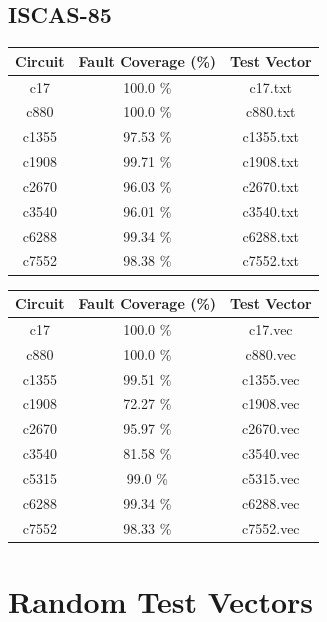 \documentclass[a4paper,12pt]{article}
\begin{document}
\clearpage
\subsection*{ISCAS-85}

\begin{center}
\begin{tabular}{||c c c||}
\hline
Circuit & Fault Coverage (\%) & Test Vector \\ [0.5ex] 
\hline\hline
c17 & 100.0 \%  & c17.txt \\ 
\hline
c880 & 100.0 \%  & c880.txt \\ 
\hline
c1355 & 97.53 \%  & c1355.txt \\ 
\hline
c1908 & 99.71 \%  & c1908.txt \\ 
\hline
c2670 & 96.03 \%  & c2670.txt \\ 
\hline
c3540 & 96.01 \%  & c3540.txt \\ 
\hline
c6288 & 99.34 \%  & c6288.txt \\ 
\hline
c7552 & 98.38 \%  & c7552.txt \\ 
\hline
\hline
\end{tabular}
\end{center}

\begin{center}
\begin{tabular}{||c c c||}
\hline
Circuit & Fault Coverage (\%) & Test Vector \\ [0.5ex] 
\hline\hline
c17 & 100.0 \%  & c17.vec \\ 
\hline
c880 & 100.0 \%  & c880.vec \\ 
\hline
c1355 & 99.51 \%  & c1355.vec \\ 
\hline
c1908 & 72.27 \%  & c1908.vec \\ 
\hline
c2670 & 95.97 \%  & c2670.vec \\ 
\hline
c3540 & 81.58 \%  & c3540.vec \\ 
\hline
c5315 & 99.0 \%  & c5315.vec \\ 
\hline
c6288 & 99.34 \%  & c6288.vec \\ 
\hline
c7552 & 98.33 \%  & c7552.vec \\ 
\hline
\hline
\end{tabular}
\end{center}


\clearpage
\section*{Random Test Vectors}
\end{document}
